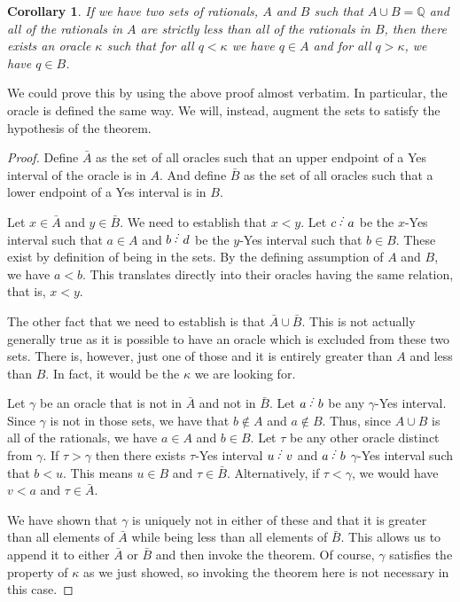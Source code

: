 \documentclass[12pt]{article}
\newtheorem{corollary}{Corollary}[subsection]
\begin{document}
\begin{corollary}
    If we have two sets of rationals, $A$ and $B$ such that $A \cup B = \mathbb{Q}$ and all of the rationals in $A$ are strictly less than all of the rationals in $B$, then there exists an oracle $\kappa$ such that for all $q < \kappa$ we have $q \in A$ and for all $q > \kappa$, we have $q \in B$.
\end{corollary}

We could prove this by using the above proof almost verbatim. In particular, the oracle is defined the same way. We will, instead, augment the sets to satisfy the hypothesis of the theorem.

\begin{proof}
    Define $\bar{A}$ as the set of all oracles such that an upper endpoint of a Yes interval of the oracle is in $A$. And define $\bar{B}$ as the set of all oracles such that a lower endpoint of a Yes interval is in $B$. 

    Let $x \in \bar{A}$ and $y \in \bar{B}$. We need to establish that $x < y$. Let $c\lte a$ be the $x$-Yes interval such that $a \in A$ and $b\lte d$ be the $y$-Yes interval such that $b \in B$. These exist by definition of being in the sets. By the defining assumption of $A$ and $B$, we have $a < b$. This translates directly into their oracles having the same relation, that is, $x < y$. 

    The other fact that we need to establish is that $\bar{A} \cup \bar{B}$. This is not actually generally true as it is possible to have an oracle which is excluded from these two sets. There is, however, just one of those and it is entirely greater than $A$ and less than $B$. In fact, it would be the $\kappa$ we are looking for. 

    Let $\gamma$ be an oracle that is not in $\bar{A}$ and not in $\bar{B}$. Let $a\lte b$ be any $\gamma$-Yes interval. Since $\gamma$ is not in those sets, we have that $b \notin A$ and $a \notin B$. Thus, since $A \cup B$ is all of the rationals, we have $a \in A$ and $b \in B$. Let $\tau$ be any other oracle distinct from $\gamma$. If $\tau > \gamma$ then there exists $\tau$-Yes interval $u\lte v$ and $a \lte b$ $\gamma$-Yes interval such that $b < u$. This means $u \in B$ and $\tau \in \bar{B}$. Alternatively, if $\tau < \gamma$, we would have $v < a$ and $\tau \in \bar{A}$.

    We have shown that $\gamma$ is uniquely not in either of these and that it is greater than all elements of $\bar{A}$ while being less than all elements of $\bar{B}$. This allows us to append it to either $\bar{A}$ or $\bar{B}$ and then invoke the theorem. Of course, $\gamma$ satisfies the property of $\kappa$ as we just showed, so invoking the theorem here is not necessary in this case. 
    
\end{proof}
\end{document}
